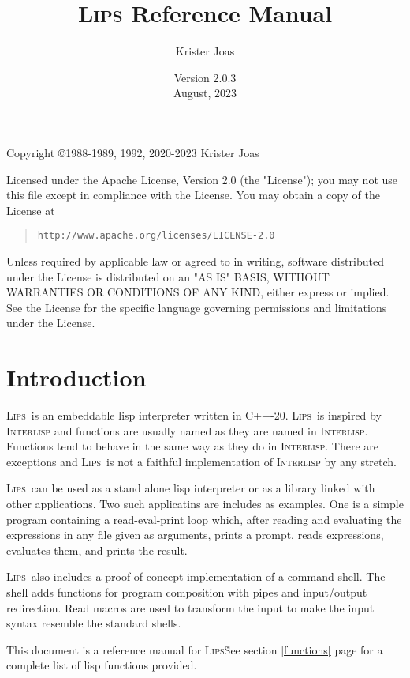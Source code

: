 \documentclass[a4paper]{article}
\title{\textsc{Lips} Reference Manual}
\author{Krister Joas}
\date{Version 2.0.3\\August, 2023}
\newcommand{\lips}{\textsc{Lips}}
\begin{document}
\maketitle

\newpage

Copyright \copyright 1988-1989, 1992, 2020-2023 Krister Joas

Licensed under the Apache License, Version 2.0 (the "License"); you
may not use this file except in compliance with the License.  You may
obtain a copy of the License at

\begin{quotation}
\texttt{http://www.apache.org/licenses/LICENSE-2.0}
\end{quotation}

Unless required by applicable law or agreed to in writing, software
distributed under the License is distributed on an "AS IS" BASIS,
WITHOUT WARRANTIES OR CONDITIONS OF ANY KIND, either express or
implied.  See the License for the specific language governing
permissions and limitations under the License.

\newpage

\section{Introduction}

\lips\ is an embeddable lisp interpreter written in \textsf{C++-20}.
\lips\ is inspired by \textsc{Interlisp} and functions are usually
named as they are named in \textsc{Interlisp}.  Functions tend to
behave in the same way as they do in \textsc{Interlisp}.  There are
exceptions and \lips\ is not a faithful implementation of
\textsc{Interlisp} by any stretch.

\lips\ can be used as a stand alone lisp interpreter or as a library
linked with other applications.  Two such applicatins are includes as
examples.  One is a simple program containing a read-eval-print loop
which, after reading and evaluating the expressions in any file given
as arguments, prints a prompt, reads expressions, evaluates them, and
prints the result.

\lips\ also includes a proof of concept implementation of a command
shell.  The shell adds functions for program composition with pipes
and input/output redirection.  Read macros are used to transform the
input to make the input syntax resemble the standard shells.

This document is a reference manual for \lips\.  See section
\ref{functions} page \pageref{functions} for a complete list of lisp
functions provided.
\end{document}
